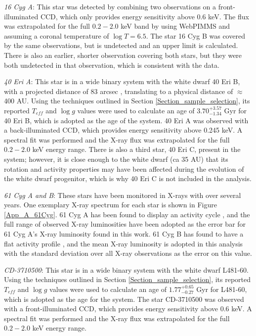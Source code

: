 \textit{16 Cyg A}: This star was detected by combining two \Chandra observations on a front-illuminated CCD, which only provides energy sensitivity above 0.6 keV. The flux was extrapolated for the full $0.2 - 2.0$ keV band by using WebPIMMS and assuming a coronal temperature of $\log T = 6.5$. The star 16 Cyg B was covered by the same observations, but is undetected and an upper limit is calculated. There is also an earlier, shorter \XMM observation covering both stars, but they were both undetected in that observation, which is consistent with the \Chandra data.

\textit{40 Eri A}: This star is in a wide binary system with the white dwarf 40 Eri B, with a projected distance of 83 arcsec \citep{Wenger_etal_2000}, translating to a physical distance of $\approx$ 400 AU. Using the techniques outlined in Section \ref{Section_sample_selection}, its reported $T_{eff}$ and $\log g$ values \citep{Zhao_etal_2012} were used to calculate an age of $3.70^{+3.57}_{-1.34}$ Gyr for 40 Eri B, which is adopted as the age of the system. 40 Eri A was observed with a back-illuminated \Chandra CCD, which provides energy sensitivity above 0.245 keV. A spectral fit was performed and the X-ray flux was extrapolated for the full $0.2 - 2.0$ keV energy range. There is also a third star, 40 Eri C, present in the system; however, it is close enough to the white dwarf (ca 35 AU) that its rotation and activity properties may have been affected during the evolution of the white dwarf progenitor, which is why 40 Eri C is not included in the analysis.

\textit{61 Cyg A and B}: These stars have been monitored in X-rays with \XMM over several years. One exemplary X-ray spectrum for each star is shown in Figure \ref{App_A_61Cyg}. 61 Cyg A has been found to display an activity cycle \citep{Robrade_etal_2012}, and the full range of observed X-ray luminosities have been adopted as the error bar for 61 Cyg A's X-ray luminosity found in this work. 61 Cyg B has found to have a flat activity profile \citep{Robrade_etal_2012}, and the mean X-ray luminosity is adopted in this analysis with the standard deviation over all X-ray observations as the error on this value.

\textit{CD-3710500}: This star is in a wide binary system with the white dwarf L481-60. Using the techniques outlined in Section \ref{Section_sample_selection}, its reported $T_{eff}$ and $\log g$ values \citep{Zhao_etal_2012} were used to calculate an age of $1.77^{+0.65}_{-0.27}$ Gyr for L481-60, which is adopted as the age for the system. The star CD-3710500 was observed with a front-illuminated \Chandra CCD, which provides energy sensitivity above 0.6 keV. A spectral fit was performed and the X-ray flux was extrapolated for the full $0.2 - 2.0$ keV energy range.

